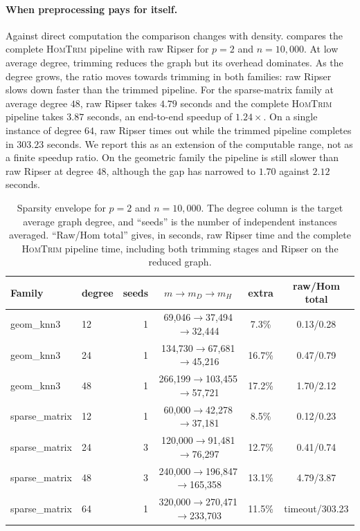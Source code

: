 \documentclass[11pt,letterpaper]{article}
\theoremstyle{definition}
\begin{document}
\paragraph{When preprocessing pays for itself.}
Against direct computation the comparison changes with density.
 compares the complete \textsc{HomTrim} pipeline
with raw Ripser for $p=2$ and $n=10{,}000$. At low average degree, trimming
reduces the graph but its overhead dominates. As the degree grows, the ratio
moves towards trimming in both families: raw Ripser slows down faster than the
trimmed pipeline. For the sparse-matrix
family at average degree $48$, raw Ripser takes $4.79$ seconds and the
complete \textsc{HomTrim} pipeline takes $3.87$ seconds, an end-to-end speedup
of $1.24\times$. On a single instance of degree $64$, raw Ripser times out
while the trimmed pipeline completes in $303.23$ seconds. We report this as an extension of the
computable range, not as a finite speedup ratio. On the geometric family the
pipeline is still slower than raw Ripser at degree $48$, although the gap has
narrowed to $1.70$ against $2.12$ seconds.

\begin{table}[ht]
\centering
\scriptsize
\setlength{\tabcolsep}{2.5pt}
\renewcommand{\arraystretch}{0.95}
\begin{tabular}{llrccc}
\toprule
Family & degree & seeds & \(m\to m_D\to m_H\) & extra & raw/Hom total \\
\midrule
geom\_knn3 & 12 & 1 & 69,046\(\to\)37,494\(\to\)32,444 & 7.3\% & 0.13/0.28 \\
geom\_knn3 & 24 & 1 & 134,730\(\to\)67,681\(\to\)45,216 & 16.7\% & 0.47/0.79 \\
geom\_knn3 & 48 & 1 & 266,199\(\to\)103,455\(\to\)57,721 & 17.2\% & 1.70/2.12 \\
sparse\_matrix & 12 & 1 & 60,000\(\to\)42,278\(\to\)37,181 & 8.5\% & 0.12/0.23 \\
sparse\_matrix & 24 & 3 & 120,000\(\to\)91,481\(\to\)76,297 & 12.7\% & 0.41/0.74 \\
sparse\_matrix & 48 & 3 & 240,000\(\to\)196,847\(\to\)165,358 & 13.1\% & 4.79/3.87 \\
sparse\_matrix & 64 & 1 & 320,000\(\to\)270,471\(\to\)233,703 & 11.5\% & timeout/303.23 \\
\bottomrule
\end{tabular}
\caption{Sparsity envelope for $p=2$ and $n=10{,}000$. The degree column is
the target average graph degree, and ``seeds'' is the number of independent
instances averaged. ``Raw/Hom total'' gives, in seconds, raw Ripser time and
the complete \textsc{HomTrim} pipeline time, including both trimming stages
and Ripser on the reduced graph.}
\label{tab:sparsity-compact}
\end{table}
\end{document}
